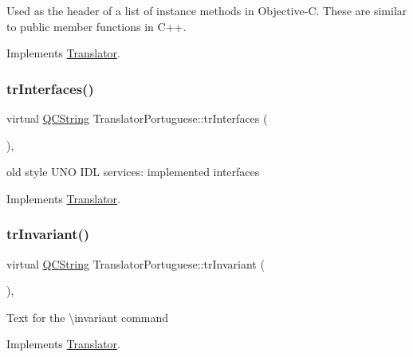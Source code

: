 Used as the header of a list of instance methods in Objective-\/C. These are similar to public member functions in C++. 

Implements \mbox{\hyperlink{class_translator}{Translator}}.

\mbox{\label{class_translator_portuguese_a71e2e46b7690a03aece2e2593dd7554f}} 
\subsubsection{\texorpdfstring{trInterfaces()}{trInterfaces()}}
{\footnotesize\ttfamily virtual \mbox{\hyperlink{class_q_c_string}{Q\+C\+String}} Translator\+Portuguese\+::tr\+Interfaces (\begin{DoxyParamCaption}{ }\end{DoxyParamCaption})\hspace{0.3cm}{\ttfamily [inline]}, {\ttfamily [virtual]}}

old style U\+NO I\+DL services\+: implemented interfaces 

Implements \mbox{\hyperlink{class_translator}{Translator}}.

\mbox{\label{class_translator_portuguese_a97df3abf4bebd252fb4369418d01ea31}} 
\subsubsection{\texorpdfstring{trInvariant()}{trInvariant()}}
{\footnotesize\ttfamily virtual \mbox{\hyperlink{class_q_c_string}{Q\+C\+String}} Translator\+Portuguese\+::tr\+Invariant (\begin{DoxyParamCaption}{ }\end{DoxyParamCaption})\hspace{0.3cm}{\ttfamily [inline]}, {\ttfamily [virtual]}}

Text for the \textbackslash{}invariant command 

Implements \mbox{\hyperlink{class_translator}{Translator}}.

\mbox{\label{class_translator_portuguese_ad39bbcc7ec7759ed18f439ec3eaca05e}} 
